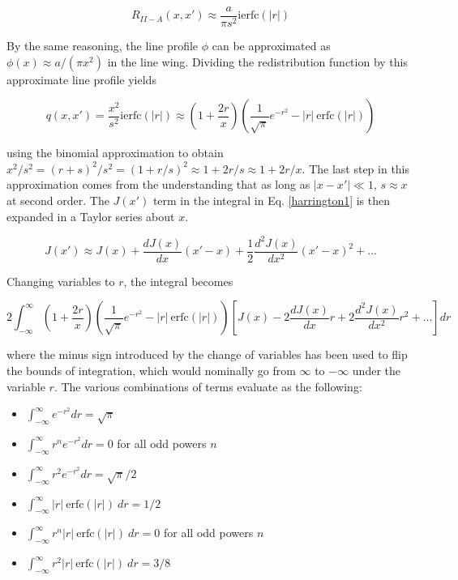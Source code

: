 \documentclass[onecolumn]{aastex63}
\begin{document}
\begin{equation}
    R_{II-A}(x, x') \approx \frac{a}{\pi s^2}\mathrm{ierfc}(|r|)
\end{equation}

\noindent By the same reasoning, the line profile $\phi$ can be approximated as $\phi(x) \approx a/(\pi x^2)$ in the line wing. Dividing the redistribution function by this approximate line profile yields 

\begin{equation}
    q(x, x') = \frac{x^2}{s^2} \mathrm{ierfc}(|r|) \approx \left(1+\frac{2r}{x}\right)\left(\frac{1}{\sqrt{\pi}}e^{-r^2} - |r|\ \mathrm{erfc}(|r|)\right)
\end{equation}

\noindent using the binomial approximation to obtain $x^2/s^2 = (r+s)^2/s^2 = (1+r/s)^2 \approx 1 + 2r/s \approx 1 + 2r/x$. The last step in this approximation comes from the understanding that as long as $|x-x'|\ll 1$, $s \approx x$ at second order. The $J(x')$ term in the integral in Eq. \ref{harrington1} is then expanded in a Taylor series about $x$.

\begin{equation}
    J(x') \approx J(x) + \frac{dJ(x)}{dx}(x' - x) + \frac{1}{2}\frac{d^2J(x)}{dx^2}(x'-x)^2 + ...
\end{equation}

\noindent Changing variables to $r$, the integral becomes

\begin{equation}
    2 \int_{-\infty}^{\infty} \left(1+\frac{2r}{x}\right)\left(\frac{1}{\sqrt{\pi}}e^{-r^2} - |r|\ \mathrm{erfc}(|r|)\right)\left[J(x) - 2\frac{dJ(x)}{dx}r + 2\frac{d^2J(x)}{dx^2}r^2 + ...\right] dr
\end{equation}

\noindent where the minus sign introduced by the change of variables has been used to flip the bounds of integration, which would nominally go from $\infty$ to $-\infty$ under the variable $r$. The various combinations of terms evaluate as the following:

\begin{itemize}
    \item $\int_{-\infty}^{\infty} e^{-r^2} dr = \sqrt{\pi}$
    \item $\int_{-\infty}^{\infty} r^{n} e^{-r^2} dr = 0$ for all odd powers $n$
    \item $\int_{-\infty}^{\infty} r^2 e^{-r^2} dr = \sqrt{\pi}/2$
    \item $\int_{-\infty}^{\infty} |r|\ \mathrm{erfc}(|r|)\ dr = 1/2$
    \item $\int_{-\infty}^{\infty} r^n |r|\ \mathrm{erfc}(|r|)\ dr = 0$ for all odd powers $n$
    \item $\int_{-\infty}^{\infty} r^2 |r|\ \mathrm{erfc}(|r|)\ dr = 3/8$
\end{itemize}
\end{document}
